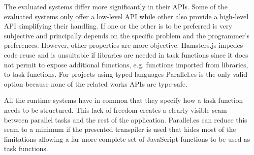 The evaluated systems differ more significantly in their APIs. Some of the evaluated systems only offer a low-level API while other also provide a high-level API simplifying their handling. If one or the other is to be preferred is very subjective and principally depends on the specific problem and the programmer's preferences. However, other properties are more objective. Hamsters.js impedes code reuse and is unsuitable if libraries are needed in task functions since it does not permit to expose additional functions, e.g. functions imported from libraries, to task functions. For projects using typed-languages Parallel.es is the only valid option because none of the related works APIs are type-safe.

All the runtime systems have in common that they specify how a task function needs to be structured. This lack of freedom creates a clearly visible seam between parallel tasks and the rest of the application. Parallel.es can reduce this seam to a minimum if the presented transpiler is used that hides most of the limitations allowing a far more complete set of JavaScript functions to be used as task functions.
